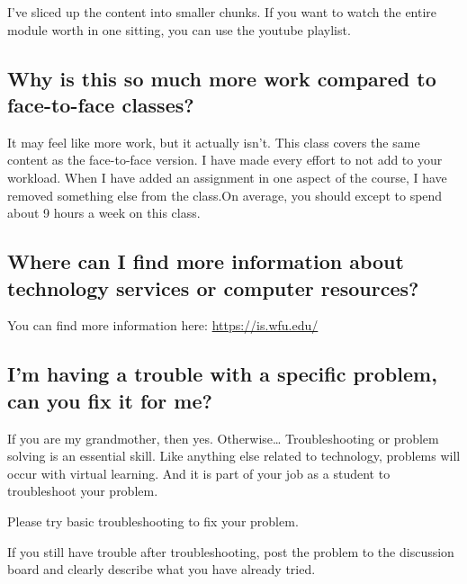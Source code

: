 \documentclass[
]{book}
\begin{document}
I've sliced up the content into smaller chunks.
If you want to watch the entire module worth in one sitting, you can use the youtube playlist.

\hypertarget{why-is-this-so-much-more-work-compared-to-face-to-face-classes}{%
\subsection{Why is this so much more work compared to face-to-face classes?}\label{why-is-this-so-much-more-work-compared-to-face-to-face-classes}}

It may feel like more work, but it actually isn't. This class covers the same content as the face-to-face version. I have made every effort to not add to your workload. When I have added an assignment in one aspect of the course, I have removed something else from the class.On average, you should except to spend about 9 hours a week on this class.

\hypertarget{where-can-i-find-more-information-about-technology-services-or-computer-resources}{%
\subsection{Where can I find more information about technology services or computer resources?}\label{where-can-i-find-more-information-about-technology-services-or-computer-resources}}

You can find more information here: \url{https://is.wfu.edu/}

\hypertarget{im-having-a-trouble-with-a-specific-problem-can-you-fix-it-for-me}{%
\subsection{I'm having a trouble with a specific problem, can you fix it for me?}\label{im-having-a-trouble-with-a-specific-problem-can-you-fix-it-for-me}}

If you are my grandmother, then yes. Otherwise\ldots{} Troubleshooting or problem solving is an essential skill. Like anything else related to technology, problems will occur with virtual learning. And it is part of your job as a student to troubleshoot your problem.

Please try basic troubleshooting to fix your problem.

If you still have trouble after troubleshooting, post the problem to the discussion board and clearly describe what you have already tried.
\end{document}
